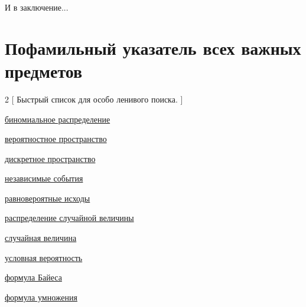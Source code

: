 \documentclass[a4paper,100pt]{article}
\theoremstyle{indented}
\theoremstyle{definition}
\theoremstyle{remark}
\begin{document}
\newpage

\hypertarget{t2}{И в заключение...}

\section{Пофамильный указатель всех важных предметов}

\begin{multicols}{2}
    [
    Быстрый список для особо ленивого поиска.
    ]

    \hyperlink{n1}{биномиальное распределение}\
    
    \hyperlink{n1}{вероятностное пространство}\
    
    \hyperlink{n2}{дискретное пространство}\

    \hyperlink{n7}{независимые события}\

    \hyperlink{n3}{равновероятные исходы}\

    \hyperlink{n1}{распределение случайной величины}\

    \hyperlink{n8}{случайная величина}\

    \hyperlink{n4}{условная вероятность}\

    \hyperlink{n5}{формула Байеса}\

    \hyperlink{n6}{формула умножения}\



\end{multicols}
\end{document}
